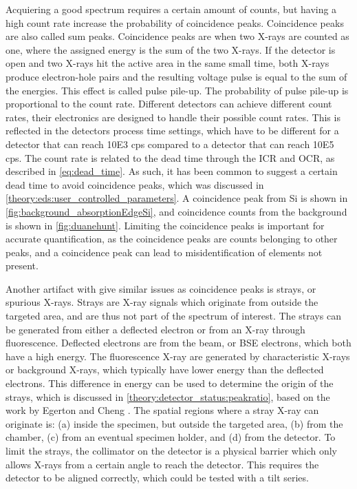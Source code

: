 Acquiering a good spectrum requires a certain amount of counts, but having a high count rate increase the probability of coincidence peaks.
Coincidence peaks are also called sum peaks.
Coincidence peaks are when two X-rays are counted as one, where the assigned energy is the sum of the two X-rays.
If the detector is open and two X-rays hit the active area in the same small time, both X-rays produce electron-hole pairs and the resulting voltage pulse is equal to the sum of the energies.
This effect is called pulse pile-up.
The probability of pulse pile-up is proportional to the count rate.
Different detectors can achieve different count rates, their electronics are designed to handle their possible count rates.
This is reflected in the detectors process time settings, which have to be different for a detector that can reach 10E3 cps compared to a detector that can reach 10E5 cps.
The count rate is related to the dead time through the ICR and OCR, as described in \cref{eq:dead_time}.
As such, it has been common to suggest a certain dead time to avoid coincidence peaks, which was discussed in \cref{theory:eds:user_controlled_parameters}.
A coincidence peak from Si is shown in \cref{fig:background_absorptionEdgeSi}, and coincidence counts from the background is shown in \cref{fig:duanehunt}.
Limiting the coincidence peaks is important for accurate quantification, as the coincidence peaks are counts belonging to other peaks, and a coincidence peak can lead to misidentification of elements not present.



Another artifact with give similar issues as coincidence peaks is strays, or spurious X-rays.
Strays are X-ray signals which originate from outside the targeted area, and are thus not part of the spectrum of interest.
The strays can be generated from either a deflected electron or from an X-ray through fluorescence.
Deflected electrons are from the beam, or BSE electrons, which both have a high energy.
The fluorescence X-ray are generated by characteristic X-rays or background X-rays, which typically have lower energy than the deflected electrons.
This difference in energy can be used to determine the origin of the strays, which is discussed in \cref{theory:detector_status:peakratio}, based on the work by Egerton and Cheng \cite{egerton_nio_characterization_1994}.
The spatial regions where a stray X-ray can originate is: (a) inside the specimen, but outside the targeted area, (b) from the chamber, (c) from an eventual specimen holder, and (d) from the detector.
To limit the strays, the collimator on the detector is a physical barrier which only allows X-rays from a certain angle to reach the detector.
This requires the detector to be aligned correctly, which could be tested with a tilt series.

